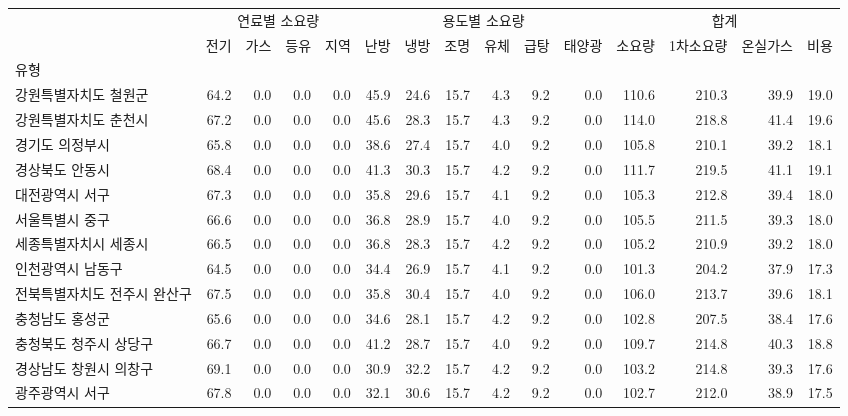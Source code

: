 \begin{defaulttable}
\tiny
\caption{기상데이터별 ASHRAE 140-modified 시뮬레이션 결과}

\begin{tabular}{lrrrrrrrrrrrrrr}
\toprule
 & \multicolumn{4}{|c}{연료별 소요량} & \multicolumn{6}{|c}{용도별 소요량} & \multicolumn{4}{|c}{합계} \\
 & 전기 & 가스 & 등유 & 지역 & 난방 & 냉방 & 조명 & 유체 & 급탕 & 태양광 & 소요량 & 1차소요량 & 온실가스 & 비용 \\
유형 &  &  &  &  &  &  &  &  &  &  &  &  &  &  \\
\midrule
강원특별자치도 철원군 & 64.2 & 0.0 & 0.0 & 0.0 & 45.9 & 24.6 & 15.7 & 4.3 & 9.2 & 0.0 & 110.6 & 210.3 & 39.9 & 19.0 \\
강원특별자치도 춘천시 & 67.2 & 0.0 & 0.0 & 0.0 & 45.6 & 28.3 & 15.7 & 4.3 & 9.2 & 0.0 & 114.0 & 218.8 & 41.4 & 19.6 \\
경기도 의정부시 & 65.8 & 0.0 & 0.0 & 0.0 & 38.6 & 27.4 & 15.7 & 4.0 & 9.2 & 0.0 & 105.8 & 210.1 & 39.2 & 18.1 \\
경상북도 안동시 & 68.4 & 0.0 & 0.0 & 0.0 & 41.3 & 30.3 & 15.7 & 4.2 & 9.2 & 0.0 & 111.7 & 219.5 & 41.1 & 19.1 \\
대전광역시 서구 & 67.3 & 0.0 & 0.0 & 0.0 & 35.8 & 29.6 & 15.7 & 4.1 & 9.2 & 0.0 & 105.3 & 212.8 & 39.4 & 18.0 \\
서울특별시 중구 & 66.6 & 0.0 & 0.0 & 0.0 & 36.8 & 28.9 & 15.7 & 4.0 & 9.2 & 0.0 & 105.5 & 211.5 & 39.3 & 18.0 \\
세종특별자치시 세종시 & 66.5 & 0.0 & 0.0 & 0.0 & 36.8 & 28.3 & 15.7 & 4.2 & 9.2 & 0.0 & 105.2 & 210.9 & 39.2 & 18.0 \\
인천광역시 남동구 & 64.5 & 0.0 & 0.0 & 0.0 & 34.4 & 26.9 & 15.7 & 4.1 & 9.2 & 0.0 & 101.3 & 204.2 & 37.9 & 17.3 \\
전북특별자치도 전주시 완산구 & 67.5 & 0.0 & 0.0 & 0.0 & 35.8 & 30.4 & 15.7 & 4.0 & 9.2 & 0.0 & 106.0 & 213.7 & 39.6 & 18.1 \\
충청남도 홍성군 & 65.6 & 0.0 & 0.0 & 0.0 & 34.6 & 28.1 & 15.7 & 4.2 & 9.2 & 0.0 & 102.8 & 207.5 & 38.4 & 17.6 \\
충청북도 청주시 상당구 & 66.7 & 0.0 & 0.0 & 0.0 & 41.2 & 28.7 & 15.7 & 4.0 & 9.2 & 0.0 & 109.7 & 214.8 & 40.3 & 18.8 \\
경상남도 창원시 의창구 & 69.1 & 0.0 & 0.0 & 0.0 & 30.9 & 32.2 & 15.7 & 4.2 & 9.2 & 0.0 & 103.2 & 214.8 & 39.3 & 17.6 \\
광주광역시 서구 & 67.8 & 0.0 & 0.0 & 0.0 & 32.1 & 30.6 & 15.7 & 4.2 & 9.2 & 0.0 & 102.7 & 212.0 & 38.9 & 17.5 \\

\end{tabular}
\end{defaulttable}
